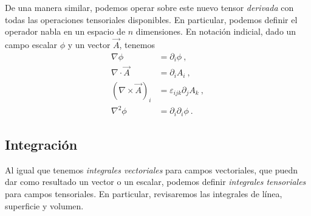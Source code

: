 De una manera similar, podemos operar sobre este nuevo tensor \emph{derivada} con todas las operaciones tensoriales disponibles. En particular, podemos definir el operador nabla en un espacio de $n$ dimensiones. En notación indicial, dado un campo escalar $\phi$ y un vector $\vec{A}$, tenemos
\begin{align}
    \nabla \phi & = \partial_i \phi \ , \\
    \nabla \cdot \vec{A} & = \partial_i A_i \ , \\
    (\nabla \times \vec{A})_i & = \varepsilon_{ijk} \partial_j A_k \ , \\
    \nabla^2 \phi & = \partial_i \partial_i \phi \ .
\end{align}

\subsection{Integración}

Al igual que tenemos \emph{integrales vectoriales} para campos vectoriales, que puedn dar como resultado un vector o un escalar, podemos definir \emph{integrales tensoriales} para campos tensoriales. En particular, revisaremos las integrales de línea, superficie y volumen.
